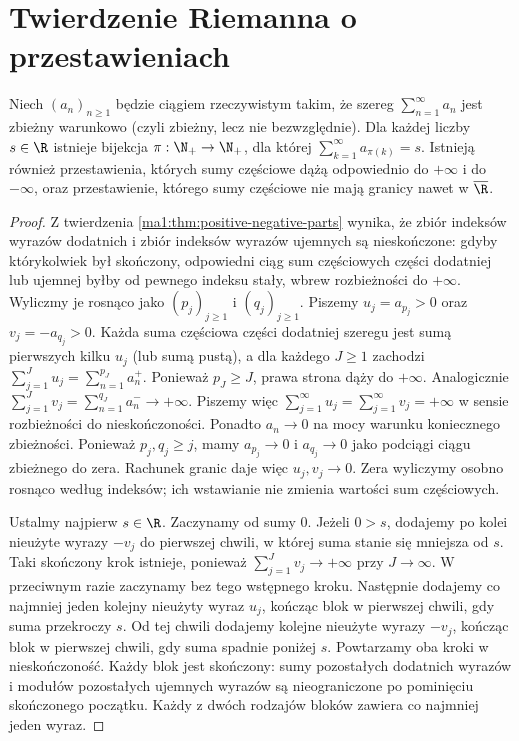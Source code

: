 \section{Twierdzenie Riemanna o przestawieniach}
\begin{twierdzenie}[Riemanna]
\label{ma1:thm:riemann-rearrangement}
Niech $(a_n)_{n\ge1}$ będzie ciągiem rzeczywistym takim, że szereg $\sum_{n=1}^\infty a_n$ jest zbieżny warunkowo (czyli zbieżny, lecz nie bezwzględnie). Dla każdej liczby $s\in\R$ istnieje bijekcja $\pi:\N_+\to\N_+$, dla której $\sum_{k=1}^\infty a_{\pi(k)}=s$. Istnieją również przestawienia, których sumy częściowe dążą odpowiednio do $+\infty$ i do $-\infty$, oraz przestawienie, którego sumy częściowe nie mają granicy nawet w $\overline{\R}$.
\end{twierdzenie}
\begin{proof}
Z twierdzenia \ref{ma1:thm:positive-negative-parts} wynika, że zbiór indeksów wyrazów dodatnich i zbiór indeksów wyrazów ujemnych są nieskończone: gdyby którykolwiek był skończony, odpowiedni ciąg sum częściowych części dodatniej lub ujemnej byłby od pewnego indeksu stały, wbrew rozbieżności do $+\infty$. Wyliczmy je rosnąco jako $(p_j)_{j\ge1}$ i $(q_j)_{j\ge1}$. Piszemy $u_j=a_{p_j}>0$ oraz $v_j=-a_{q_j}>0$. Każda suma częściowa części dodatniej szeregu jest sumą pierwszych kilku $u_j$ (lub sumą pustą), a dla każdego $J\ge1$ zachodzi $\sum_{j=1}^J u_j=\sum_{n=1}^{p_J}a_n^+$. Ponieważ $p_J\ge J$, prawa strona dąży do $+\infty$. Analogicznie $\sum_{j=1}^J v_j=\sum_{n=1}^{q_J}a_n^-\to+\infty$. Piszemy więc $\sum_{j=1}^\infty u_j=\sum_{j=1}^\infty v_j=+\infty$ w sensie rozbieżności do nieskończoności. Ponadto $a_n\to0$ na mocy warunku koniecznego zbieżności. Ponieważ $p_j,q_j\ge j$, mamy $a_{p_j}\to0$ i $a_{q_j}\to0$ jako podciągi ciągu zbieżnego do zera. Rachunek granic daje więc $u_j,v_j\to0$. Zera wyliczymy osobno rosnąco według indeksów; ich wstawianie nie zmienia wartości sum częściowych.

Ustalmy najpierw $s\in\R$. Zaczynamy od sumy $0$. Jeżeli $0>s$, dodajemy po kolei nieużyte wyrazy $-v_j$ do pierwszej chwili, w której suma stanie się mniejsza od $s$. Taki skończony krok istnieje, ponieważ $\sum_{j=1}^J v_j\to+\infty$ przy $J\to\infty$. W przeciwnym razie zaczynamy bez tego wstępnego kroku. Następnie dodajemy co najmniej jeden kolejny nieużyty wyraz $u_j$, kończąc blok w pierwszej chwili, gdy suma przekroczy $s$. Od tej chwili dodajemy kolejne nieużyte wyrazy $-v_j$, kończąc blok w pierwszej chwili, gdy suma spadnie poniżej $s$. Powtarzamy oba kroki w nieskończoność. Każdy blok jest skończony: sumy pozostałych dodatnich wyrazów i modułów pozostałych ujemnych wyrazów są nieograniczone po pominięciu skończonego początku. Każdy z dwóch rodzajów bloków zawiera co najmniej jeden wyraz.


\end{proof}
